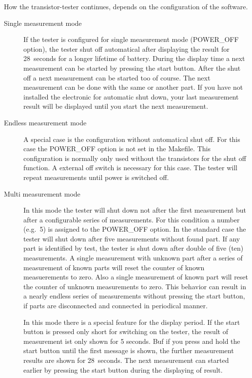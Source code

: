 How the transistor-tester continues, depends on the configuration of the software.
\begin{description}
  \item[Single measurement mode] If the tester is configured for single measurement mode (POWER\_OFF option), the tester shut off automatical 
after displaying the result for 28~seconds for a longer lifetime of battery. 
During the display time a next measurement can be started by pressing the start button.
After the shut off a next measurement can be started too of course.
The next measurement can be done with the same or another part.
If you have not installed the electronic for automatic shut down, your
last measurement result will be displayed until you start the next measurement.

  \item[Endless measurement mode] A special case is the configuration without automatical shut off.
For this case the POWER\_OFF option is not set in the Makefile.
This configuration is normally only used without the transistors for the shut off function.
A external off switch is necessary for this case. The tester will repeat measurements until power
is switched off.

  \item[Multi measurement mode] In this mode the tester will shut down not after the first measurement but 
after a configurable series of measurements.
For this condition a number (e.g.~5) is assigned to the POWER\_OFF option.
In the standard case the tester will shut down after five
measurements without found part. If any part is identified by test, the tester is shut down after double of
five (ten) measurements. A single measurement with unknown part after a series of measurement of known parts will
reset the counter of known measuerements to zero. Also a single measurement of known part will reset the counter
of unknown measurements to zero. This behavior can result in a nearly endless series of measurements without
pressing the start button, if parts are disconnected and connected in periodical manner.

In this mode there is a special feature for the display period. If the start button is pressed only short for switching
on the tester, the result of measurement ist only shown for 5 seconds. Buf if you press and hold the start button until
the first message is shown, the further measurement results are shown for 28~seconds.
The next measurement can started earlier by pressing the start button during the displaying of result.

\end{description}

